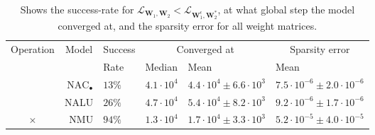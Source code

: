 \begin{table}[H]

\caption{\label{tab:very-simple-function-results}Shows the success-rate for $\mathcal{L}_{\mathbf{W}_1, \mathbf{W}_2} < \mathcal{L}_{\mathbf{W}_1^\epsilon, \mathbf{W}_2^*}$, at what global step the model converged at, and the sparsity error for all weight matrices.}
\centering
\begin{tabular}{crllll}
\toprule
\multicolumn{1}{c}{Operation} & \multicolumn{1}{c}{Model} & \multicolumn{1}{c}{Success} & \multicolumn{2}{c}{Converged at} & \multicolumn{1}{c}{Sparsity error} \\
\cmidrule(l{3pt}r{3pt}){1-1} \cmidrule(l{3pt}r{3pt}){2-2} \cmidrule(l{3pt}r{3pt}){3-3} \cmidrule(l{3pt}r{3pt}){4-5} \cmidrule(l{3pt}r{3pt}){6-6}
 &  & Rate & Median & Mean & Mean\\
\midrule
 & ${\mathrm{NAC}_\bullet}$ & $13\%$ & $4.1 \cdot 10^{4}$ & $4.4 \cdot 10^{4} \pm 6.6 \cdot 10^{3}$ & $7.5 \cdot 10^{-6} \pm 2.0 \cdot 10^{-6}$\\

 & NALU & $26\%$ & $4.7 \cdot 10^{4}$ & $5.4 \cdot 10^{4} \pm 8.2 \cdot 10^{3}$ & $9.2 \cdot 10^{-6} \pm 1.7 \cdot 10^{-6}$\\

\multirow{-3}{*}{\centering\arraybackslash $\bm{\times}$} & NMU & $94\%$ & $1.3 \cdot 10^{4}$ & $1.7 \cdot 10^{4} \pm 3.3 \cdot 10^{3}$ & $5.2 \cdot 10^{-5} \pm 4.0 \cdot 10^{-5}$\\
\bottomrule
\end{tabular}
\end{table}

